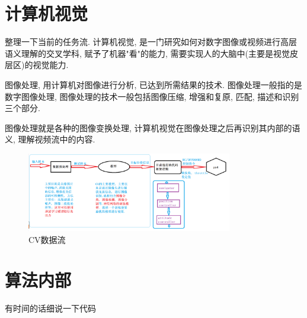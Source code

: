     \section{计算机视觉}
        整理一下当前的任务流.
      计算机视觉, 是一门研究如何对数字图像或视频进行高层语义理解的交叉学科, 赋予了机器"看"的能力, 需要实现人的大脑中(主要是视觉皮层区)的视觉能力. \par
      图像处理, 用计算机对图像进行分析, 已达到所需结果的技术. 图像处理一般指的是数字图像处理, 图像处理的技术一般包括图像压缩, 增强和复原, 匹配, 描述和识别三个部分. 
      \par 图像处理就是各种的图像变换处理, 计算机视觉在图像处理之后再识别其内部的语义, 理解视频流中的内容. 
    \begin{figure}[htbp]
        \centering
        \includegraphics[width=0.8\textwidth]{pictures/chapter1/CV_Flow.png}
        \caption{CV数据流}
    \end{figure}  
    \clearpage
    \section{算法内部}
        有时间的话细说一下代码
% 
